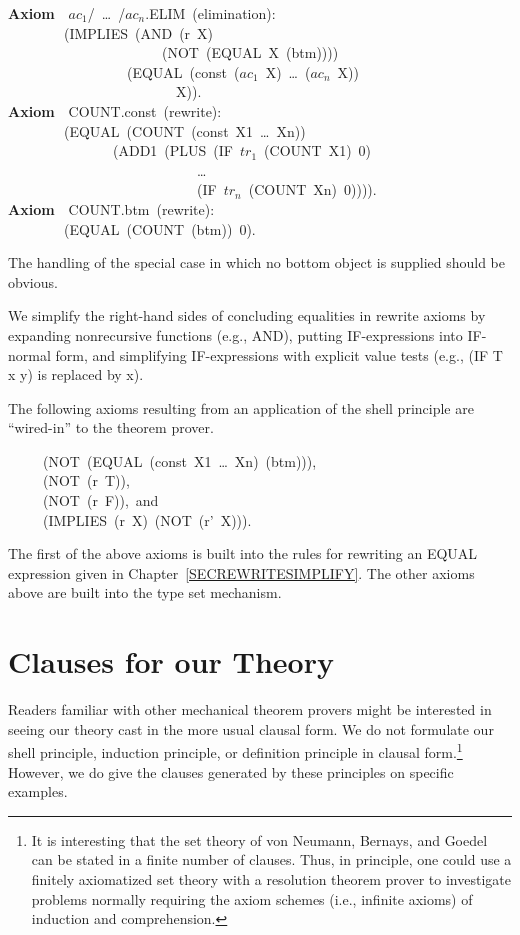 \documentclass[10pt]{book}
\newenvironment{pubasis}{\begin{flushleft}}{\end{flushleft}}
\newcommand{\axiomordefinition}[1]{\vspace{6pt}\Large\textsf{\textbf{#1}}\normalsize}
\begin{document}
\begin{pubasis}
\axiomordefinition{Axiom}~~$ac_{1}$/~\ldots{}~/$ac_{n}$.ELIM~(elimination):\\
~~~~~~~~(IMPLIES~(AND~(r~X)\\
~~~~~~~~~~~~~~~~~~~~~~(NOT~(EQUAL~X~(btm))))\\
~~~~~~~~~~~~~~~~~(EQUAL~(const~($ac_{1}$~X)~\ldots{}~($ac_{n}$~X))\\
~~~~~~~~~~~~~~~~~~~~~~~~X)).\\

\axiomordefinition{Axiom}~~COUNT.const~(rewrite):\\
~~~~~~~~(EQUAL~(COUNT~(const~X1~\ldots{}~Xn))\\
~~~~~~~~~~~~~~~(ADD1~(PLUS~(IF~$tr_{1}$~(COUNT~X1)~0)\\
~~~~~~~~~~~~~~~~~~~~~~~~~~~\ldots{}\\
~~~~~~~~~~~~~~~~~~~~~~~~~~~(IF~$tr_{n}$~(COUNT~Xn)~0)))).\\

\axiomordefinition{Axiom}~~COUNT.btm~(rewrite):\\
~~~~~~~~(EQUAL~(COUNT~(btm))~0).\\
\end{pubasis}
The handling of the special case in which no bottom object is supplied
should be obvious.

We simplify the right-hand sides of concluding equalities in rewrite
axioms by expanding nonrecursive functions (e.g., AND), putting
IF-expressions into IF-normal form, and simplifying
IF-expressions with explicit value tests (e.g., (IF T x y) is replaced by x).

The following axioms resulting from an application of the shell principle are 
``wired-in'' to the theorem prover.
\begin{pubasis}
~~~~~(NOT~(EQUAL~(const~X1~\ldots{}~Xn)~(btm))),\\
~~~~~(NOT~(r~T)),\\
~~~~~(NOT~(r~F)),~and\\
~~~~~(IMPLIES~(r~X)~(NOT~(r'~X))).\\
\end{pubasis}
The first of the above axioms is built into the rules for
rewriting an EQUAL expression given in Chapter~\ref{SECREWRITESIMPLIFY}.
The other axioms above are built into the type set
mechanism.

\chapter{Clauses for our Theory}
\pagestyle{headings}
\label{APPCLAUSES}
Readers familiar with other mechanical theorem provers might be interested
in seeing our theory cast in the more usual clausal form.  We
do not formulate our shell principle, induction principle, or definition
principle in clausal form.\footnote{It is interesting that the set theory of von Neumann, Bernays, and Goedel \cite{GOEDEL} can be stated in a finite number of clauses. Thus, in principle, one could use a finitely axiomatized set theory with a resolution theorem prover to investigate problems normally requiring  the axiom schemes (i.e., infinite axioms) of induction and comprehension.}
However, we do give the clauses generated
by these principles on specific examples.
\end{document}
